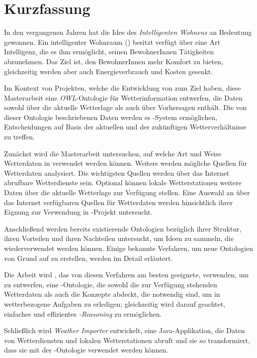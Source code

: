 \chapter*{Kurzfassung}

In den vergangenen Jahren hat die Idee des \emph{Intelligenten Wohnens} an Bedeutung gewonnen. Ein intelligenter Wohnraum (\smarthome) besitzt verfügt über eine Art Intelligenz, die es ihm ermöglicht, seinen BewohnerInnen Tätigkeiten abzunehmen. Das Ziel ist, den BewohnerInnen mehr Komfort zu bieten, gleichzeitig werden aber auch Energieverbrauch und Kosten gesenkt.

Im Kontext von Projekten, welche die Entwicklung von \smarthomes zum Ziel haben, diese Masterarbeit eine \emph{OWL}-Ontologie für Wetterinformation entwerfen, die Daten sowohl über die aktuelle Wetterlage als auch über Vorhersagen enthält. Die von dieser Ontologie beschriebenen Daten werden es \smarthome-System ermöglichen, Entscheidungen auf Basis der aktuellen und der zukünftigen Wetterverhältnisse zu treffen.

Zunächst wird die Masterarbeit untersuchen, auf welche Art und Weise Wetterdaten in \smarthomes verwendet werden können. Weiters werden mögliche Quellen für Wetterdaten analysiert. Die wichtigsten Quellen werden über das Internet abrufbare Wetterdienste sein. Optional können lokale Wetterstationen weitere Daten über die aktuelle Wetterlage zur Verfügung stellen. Eine Auswahl an über das Internet verfügbaren Quellen für Wetterdaten werden hinsichtlich ihrer Eignung zur Verwendung in \smarthome-Projekt untersucht.

Anschließend werden bereits existierende Ontologien bezüglich ihrer Struktur, ihren Vorteilen und ihren Nachteilen untersucht, um Ideen zu sammeln, die wiederverwendet werden können. Einige bekannte Verfahren, um neue Ontologien von Grund auf zu erstellen, werden im Detail erläutert.

Die Arbeit wird \methontology, das von diesen Verfahren am besten geeignete, verwenden, um \smarthomeweather zu entwerfen, eine -Ontologie, die sowohl die zur Verfügung stehenden Wetterdaten als auch die Konzepte abdeckt, die notwendig sind, um in \smarthomes wetterbezogene Aufgaben zu erledigen; gleichzeitig wird darauf geachtet, einfaches und effizientes \emph{-Reasoning} zu ermöglichen.

Schließlich wird \emph{Weather Importer} entwickelt, eine Java-Applikation, die Daten von Wetterdiensten und lokalen Wetterstationen abruft und sie so transformiert, dass sie mit der \smarthomeweather-Ontologie verwendet werden können.